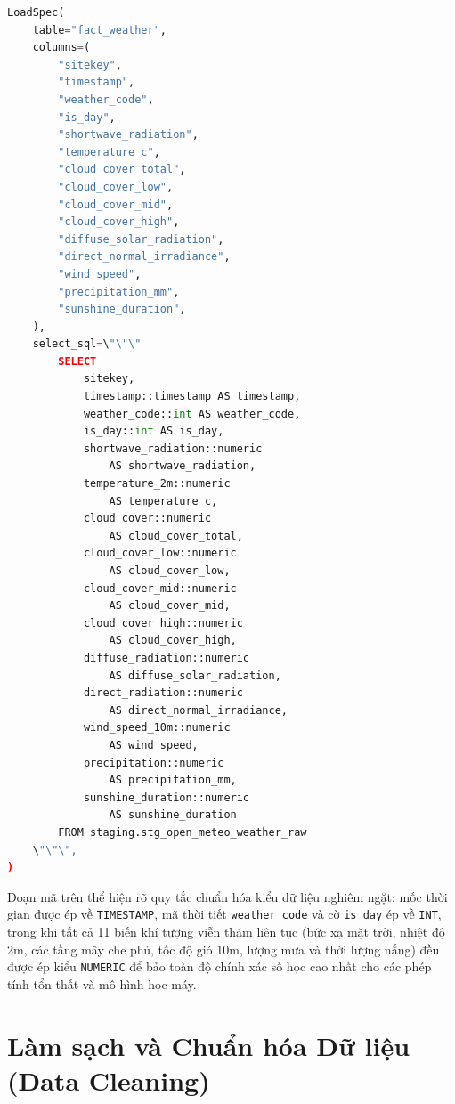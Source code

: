 \documentclass[12pt, a4paper]{report}
\begin{document}
\begin{lstlisting}[language=Python, caption={Mã nguồn Python/SQL thực tế ánh xạ và chuyển đổi kiểu dữ liệu cho bảng sự kiện fact\_weather}, label={lst:fact_weather_mapping}]
LoadSpec(
    table="fact_weather",
    columns=(
        "sitekey",
        "timestamp",
        "weather_code",
        "is_day",
        "shortwave_radiation",
        "temperature_c",
        "cloud_cover_total",
        "cloud_cover_low",
        "cloud_cover_mid",
        "cloud_cover_high",
        "diffuse_solar_radiation",
        "direct_normal_irradiance",
        "wind_speed",
        "precipitation_mm",
        "sunshine_duration",
    ),
    select_sql=\"\"\"
        SELECT
            sitekey,
            timestamp::timestamp AS timestamp,
            weather_code::int AS weather_code,
            is_day::int AS is_day,
            shortwave_radiation::numeric 
                AS shortwave_radiation,
            temperature_2m::numeric 
                AS temperature_c,
            cloud_cover::numeric 
                AS cloud_cover_total,
            cloud_cover_low::numeric 
                AS cloud_cover_low,
            cloud_cover_mid::numeric 
                AS cloud_cover_mid,
            cloud_cover_high::numeric 
                AS cloud_cover_high,
            diffuse_radiation::numeric 
                AS diffuse_solar_radiation,
            direct_radiation::numeric 
                AS direct_normal_irradiance,
            wind_speed_10m::numeric 
                AS wind_speed,
            precipitation::numeric 
                AS precipitation_mm,
            sunshine_duration::numeric 
                AS sunshine_duration
        FROM staging.stg_open_meteo_weather_raw
    \"\"\",
)
\end{lstlisting}

Đoạn mã trên thể hiện rõ quy tắc chuẩn hóa kiểu dữ liệu nghiêm ngặt: mốc thời gian được ép về \texttt{TIMESTAMP}, mã thời tiết \texttt{weather\_code} và cờ \texttt{is\_day} ép về \texttt{INT}, trong khi tất cả 11 biến khí tượng viễn thám liên tục (bức xạ mặt trời, nhiệt độ 2m, các tầng mây che phủ, tốc độ gió 10m, lượng mưa và thời lượng nắng) đều được ép kiểu \texttt{NUMERIC} để bảo toàn độ chính xác số học cao nhất cho các phép tính tổn thất và mô hình học máy.

\section{Làm sạch và Chuẩn hóa Dữ liệu (Data Cleaning)}
\label{sec:cleaning}
\end{document}
